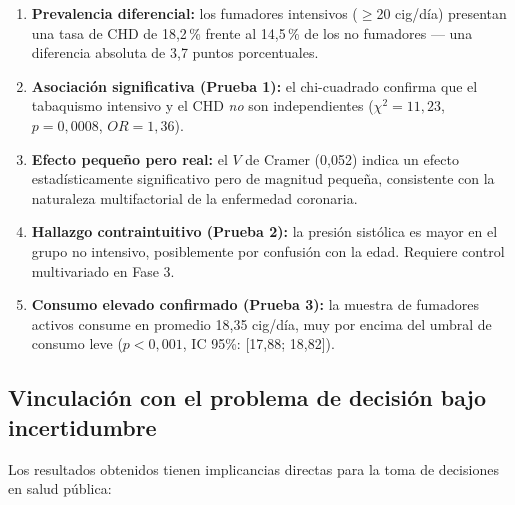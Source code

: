 \documentclass[11pt,a4paper]{article}
\begin{document}
\begin{resultbox}
\begin{enumerate}[noitemsep]
  \item \textbf{Prevalencia diferencial:} los fumadores intensivos ($\geq$20 cig/día)
        presentan una tasa de CHD de 18{,}2\,\% frente al 14{,}5\,\% de los no fumadores
        — una diferencia absoluta de 3{,}7 puntos porcentuales.

  \item \textbf{Asociación significativa (Prueba 1):} el chi-cuadrado confirma que el
        tabaquismo intensivo y el CHD \emph{no} son independientes
        ($\chi^2 = 11{,}23$, $p = 0{,}0008$, $OR = 1{,}36$).

  \item \textbf{Efecto pequeño pero real:} el $V$ de Cramer (0{,}052) indica un efecto
        estadísticamente significativo pero de magnitud pequeña, consistente con la
        naturaleza multifactorial de la enfermedad coronaria.

  \item \textbf{Hallazgo contraintuitivo (Prueba 2):} la presión sistólica es mayor
        en el grupo no intensivo, posiblemente por confusión con la edad. Requiere
        control multivariado en Fase 3.

  \item \textbf{Consumo elevado confirmado (Prueba 3):} la muestra de fumadores activos
        consume en promedio 18{,}35 cig/día, muy por encima del umbral de consumo leve
        ($p < 0{,}001$, IC 95\%: [17{,}88; 18{,}82]).
\end{enumerate}
\end{resultbox}

\subsection{Vinculación con el problema de decisión bajo incertidumbre}

Los resultados obtenidos tienen implicancias directas para la toma de decisiones en
salud pública:
\end{document}
